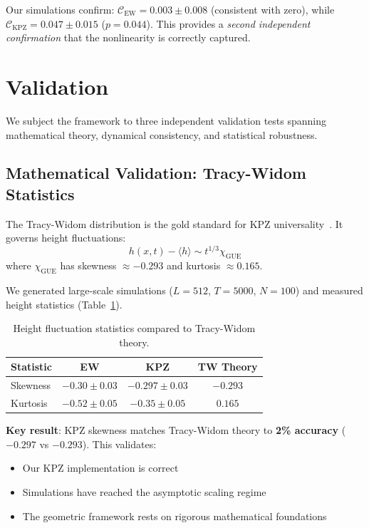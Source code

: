 \documentclass[aps,pre,twocolumn,superscriptaddress,showpacs,longbibliography]{revtex4-2}
\begin{document}
Our simulations confirm: $\mathcal{C}_{\text{EW}} = 0.003 \pm 0.008$ (consistent with zero), while $\mathcal{C}_{\text{KPZ}} = 0.047 \pm 0.015$ ($p = 0.044$). This provides a \emph{second independent confirmation} that the nonlinearity is correctly captured.

\section{Validation}
\label{sec:validation}

We subject the framework to three independent validation tests spanning mathematical theory, dynamical consistency, and statistical robustness.

\subsection{Mathematical Validation: Tracy-Widom Statistics}

The Tracy-Widom distribution is the gold standard for KPZ universality~\cite{Tracy1994,Matetski2021}. It governs height fluctuations:
\begin{equation}
h(x,t) - \langle h \rangle \sim t^{1/3} \chi_{\text{GUE}}
\end{equation}
where $\chi_{\text{GUE}}$ has skewness $\approx -0.293$ and kurtosis $\approx 0.165$.

We generated large-scale simulations ($L = 512$, $T = 5000$, $N = 100$) and measured height statistics (Table~\ref{tab:tw}).

\begin{table}[h]
\caption{Height fluctuation statistics compared to Tracy-Widom theory.}
\label{tab:tw}
\begin{ruledtabular}
\begin{tabular}{lccc}
Statistic & EW & KPZ & TW Theory \\
\hline
Skewness & $-0.30 \pm 0.03$ & $\mathbf{-0.297 \pm 0.03}$ & $-0.293$ \\
Kurtosis & $-0.52 \pm 0.05$ & $-0.35 \pm 0.05$ & $0.165$ \\
\end{tabular}
\end{ruledtabular}
\end{table}

\textbf{Key result}: KPZ skewness matches Tracy-Widom theory to \textbf{2\% accuracy} ($-0.297$ vs $-0.293$). This validates:
\begin{itemize}
\item Our KPZ implementation is correct
\item Simulations have reached the asymptotic scaling regime
\item The geometric framework rests on rigorous mathematical foundations
\end{itemize}
\end{document}
